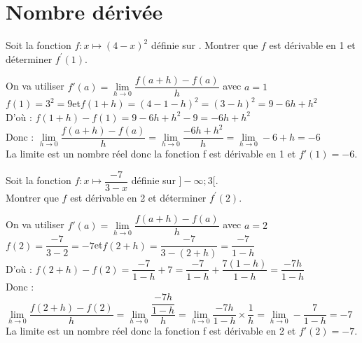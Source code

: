 \documentclass[11pt,a4paper]{article}  %
\begin{document}
	\graphicspath{{img_entrainement/}}
	
	\begin{center}
		
		
		\fbox{
			\begin{minipage}[]{15cm}
				\begin{center}
					\LARGE{\rule{0.5cm}{0pt}\rule[-0.25cm]{0pt}{0.9cm}
						\textcolor{red}{Correction - Exercices d'entrainement\\
						Dérivation}
					}
				\end{center}
			\end{minipage}
		}
	\end{center}

\section*{Nombre dérivée}

\exercice{} 

Soit la fonction $f: x \mapsto(4-x)^2$ définie sur \R. Montrer que $f$ est dérivable en 1 et déterminer $f^{\prime}(1)$.

\begin{corrBox}
	On va utiliser $f'(a)=\lim \limits_{h \rightarrow 0} \dfrac{f(a+h)-f(a)}{h}$ avec $a=1$\\
	$f(1)=3^2=9$\quad\quad et\quad\quad $f(1+h)=(4-1-h)^2=(3-h)^2=9-6h+h^2$\\
	D'où : $f(1+h)-f(1)=9-6h+h^2-9=-6h+h^2$\\
	Donc : $\lim \limits_{h \rightarrow 0} \dfrac{f(a+h)-f(a)}{h}=\lim \limits_{h \rightarrow 0} \dfrac{-6h+h^2}{h}=\lim \limits_{h \rightarrow 0} -6+h=-6$\\
	La limite est un nombre réel donc la fonction f est dérivable en 1 et $f'(1)=-6$.
\end{corrBox}

\exercice{}

Soit la fonction $f: x \mapsto\dfrac{-7}{3-x}$ définie sur $]-\infty;3[$.\\
Montrer que $f$ est dérivable en 2 et déterminer $f^{\prime}(2)$.

\begin{corrBox}
	On va utiliser $f'(a)=\lim \limits_{h \rightarrow 0} \dfrac{f(a+h)-f(a)}{h}$ avec $a=2$\\
	$f(2)=\dfrac{-7}{3-2}=-7$\quad\quad et\quad\quad  $f(2+h)=\dfrac{-7}{3-(2+h)}=\dfrac{-7}{1-h}$\\
	D'où : $f(2+h)-f(2)=\dfrac{-7}{1-h}+7=\dfrac{-7}{1-h}+\dfrac{7(1-h)}{1-h}=\dfrac{-7h}{1-h}$\\
	Donc : $\lim \limits_{h \rightarrow 0} \dfrac{f(2+h)-f(2)}{h}=\lim \limits_{h \rightarrow 0} \dfrac{\dfrac{-7h}{1-h}}{h}=\lim \limits_{h \rightarrow 0} \dfrac{-7h}{1-h}\times \dfrac{1}{h}=\lim \limits_{h \rightarrow 0} -\dfrac{7}{1-h}=-7$\\
	La limite est un nombre réel donc la fonction f est dérivable en 2 et $f'(2)=-7$.
\end{corrBox}
\end{document}
